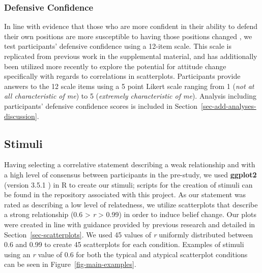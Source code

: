 \documentclass[manuscript,screen,review,anonymous]{acmart}
\begin{document}
\subsubsection{Defensive Confidence}\label{sec-def-con}

In line with evidence that those who are more confident in their ability
to defend their own positions are more susceptible to having those
positions changed \citep{albarracin_2004}, we test participants'
defensive confidence using a 12-item scale. This scale is replicated
from previous work in the supplemental material, and has additionally
been utilized more recently \citep{markant_2023} to explore the
potential for attitude change specifically with regards to correlations
in scatterplots. Participants provide answers to the 12 scale items
using a 5 point Likert scale ranging from 1 (\emph{not at all
characteristic of me}) to 5 (\emph{extremely characteristic of me}).
Analysis including participants' defensive confidence scores is included
in Section~\ref{sec-add-analyses-discussion}.

\subsection{Stimuli}\label{sec-stimuli-main}

Having selecting a correlative statement describing a weak relationship
and with a high level of consensus between participants in the
pre-study, we used \textbf{ggplot2} (version 3.5.1 \citep{ggplot}) in R
to create our stimuli; scripts for the creation of stimuli can be found
in the repository associated with this project. As our statement was
rated as describing a low level of relatedness, we utilize scatterplots
that describe a strong relationship (0.6 \textgreater{} \emph{r}
\textgreater{} 0.99) in order to induce belief change. Our plots were
created in line with guidance provided by previous research and detailed
in Section~\ref{sec-scatterplots}. We used 45 values of \emph{r}
uniformly distributed between 0.6 and 0.99 to create 45 scatterplots for
each condition. Examples of stimuli using an \emph{r} value of 0.6 for
both the typical and atypical scatterplot conditions can be seen in
Figure~\ref{fig-main-examples}.
\end{document}
